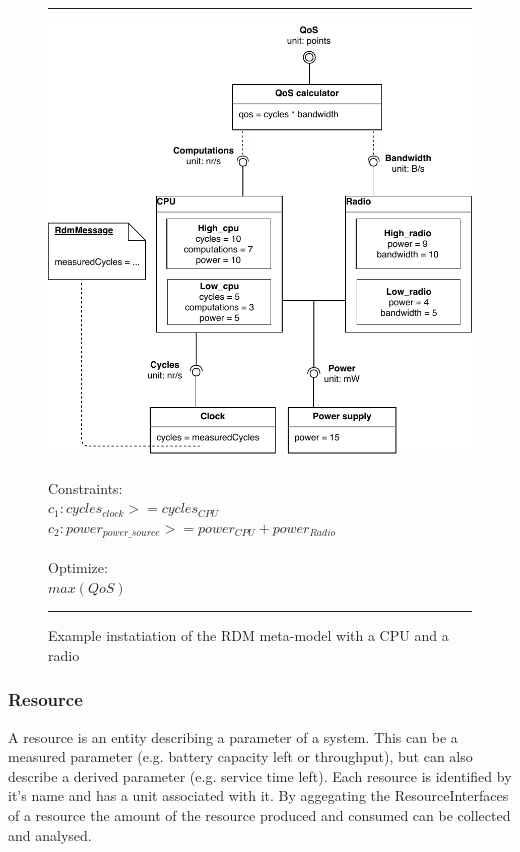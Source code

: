 \begin{figure}
\hrule
\begingroup\centering
  \includegraphics[width=\linewidth]{resources/img/rdm_cpu_radio.pdf}\endgroup \\ \\
  \noindent Constraints: \\
$c_1: cycles_{clock} >= cycles_{CPU}$ \\
$c_2: power_{power\_source} >= power_{CPU}+power_{Radio} $ \\ \\
\noindent Optimize:\\$max(QoS)$\\
\hrule
\caption{Example instatiation of the RDM meta-model with a CPU and a radio}
  \label{fig:rdm_cpu_radio}
\end{figure}

\subsubsection{Resource}
A resource is an entity describing a parameter of a system. This can be a measured parameter (e.g. battery capacity left or throughput), but can also describe a derived parameter (e.g. service time left). Each resource is identified by it's name and has a unit associated with it. By aggegating the ResourceInterfaces of a resource the amount of the resource produced and consumed can be collected and analysed.


